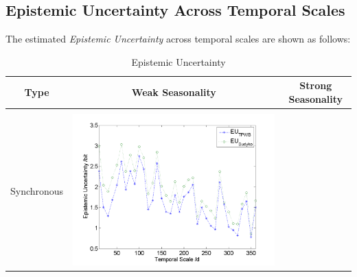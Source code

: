 \documentclass[draft,wrr]{AGUTeX}
\begin{document}
\begin{article}
\subsection{Epistemic Uncertainty Across Temporal Scales} 
The estimated \emph{Epistemic Uncertainty} across temporal scales are shown as follows:
\begin{table}[H] \small 
\label{eeuu}
\caption{Epistemic Uncertainty}
\resizebox{\textwidth}{!}
{
\centering
\begin{tabular}{ccc}
\hline
Type& Weak Seasonality & Strong Seasonality \\\hline
\\
Synchronous
&\begin{minipage}{.6\textwidth}\includegraphics[width=\linewidth]{resultgraph/05585000EU.png}\end{minipage}


\end{tabular}}
\end{table}
\end{article}
\end{document}

